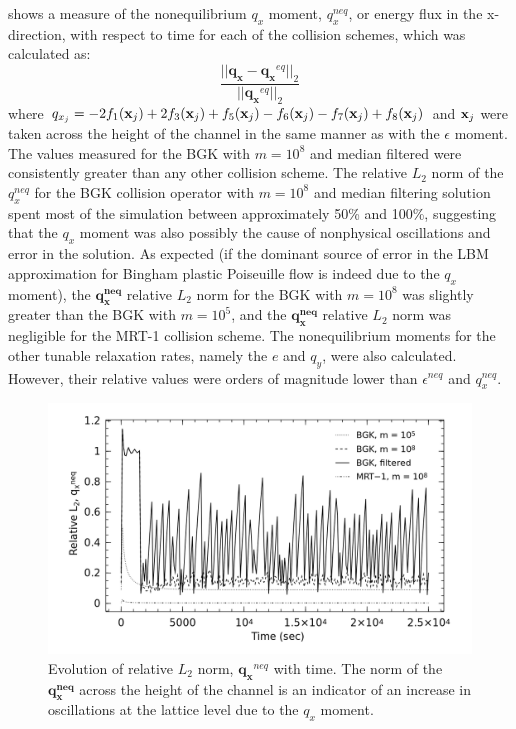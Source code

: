  shows a measure of the nonequilibrium $q_x$ moment, $q_x^{neq}$, or energy flux in the x-direction, with respect to time for each of the collision schemes, which was calculated as:
\begin{equation}
    \frac{||\mathbf{q_x} - \mathbf{q_x}^{eq}||_2}{||\mathbf{q_x}^{eq}||_2}
\end{equation}
\noindent where $q_{x_j} = - 2f_1(\mathbf{x}_j) + 2f_3(\mathbf{x}_j) + f_5(\mathbf{x}_j) - f_6(\mathbf{x}_j) - f_7(\mathbf{x}_j) + f_8(\mathbf{x}_j)$ and $\mathbf{x}_j$ were taken across the height of the channel in the same manner as with the $\epsilon$ moment.
The values measured for the BGK with $m = 10^8$ and median filtered were consistently greater than any other collision scheme.
The relative $L_2$ norm of the $q_x^{neq}$ for the BGK collision operator with $m = 10^8$ and median filtering solution spent most of the simulation between approximately 50\% and 100\%, suggesting that the $q_x$ moment was also possibly the cause of nonphysical oscillations and error in the solution.
As expected (if the dominant source of error in the LBM approximation for Bingham plastic Poiseuille flow is indeed due to the $q_x$ moment), the $\mathbf{q_x^{neq}}$ relative $L_2$ norm for the BGK with $m = 10^8$ was slightly greater than the BGK with $m = 10^5$, and the $\mathbf{q_x^{neq}}$ relative $L_2$ norm was negligible for the MRT-1 collision scheme.
The nonequilibrium moments for the other tunable relaxation rates, namely the $e$ and $q_y$, were also calculated.
However, their relative values were orders of magnitude lower than $\epsilon^{neq}$ and $q_x^{neq}$.

\begin{figure}
	\centering
    \includegraphics[width=\linewidth]{figs/poise-bingham/qx}
    \caption{Evolution of relative $L_2$ norm, $\mathbf{q_x}^{neq}$ with time. The norm of the $\mathbf{q_x^{neq}}$ across the height of the channel is an indicator of an increase in oscillations at the lattice level due to the $q_x$ moment.}
    \label{fig:qx}
\end{figure}

